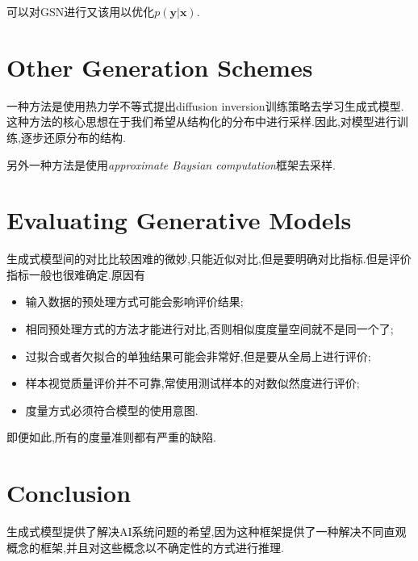 可以对GSN进行又该用以优化$p(\mathbf y|\bm x)$.

\section{Other Generation Schemes}

一种方法是使用热力学不等式提出diffusion inversion训练策略去学习生成式模型.这种方法的核心思想在于我们希望从结构化的分布中进行采样.因此,对模型进行训练,逐步还原分布的结构.

另外一种方法是使用\textit{approximate Baysian computation}框架去采样.

\section{Evaluating Generative Models}

生成式模型间的对比比较困难的微妙,只能近似对比,但是要明确对比指标.但是评价指标一般也很难确定.原因有
\begin{itemize}
    \item 输入数据的预处理方式可能会影响评价结果;
    \item 相同预处理方式的方法才能进行对比,否则相似度度量空间就不是同一个了;
    \item 过拟合或者欠拟合的单独结果可能会非常好,但是要从全局上进行评价;
    \item 样本视觉质量评价并不可靠,常使用测试样本的对数似然度进行评价;
    \item 度量方式必须符合模型的使用意图.
\end{itemize}

即便如此,所有的度量准则都有严重的缺陷.

\section{Conclusion}

生成式模型提供了解决AI系统问题的希望,因为这种框架提供了一种解决不同直观概念的框架,并且对这些概念以不确定性的方式进行推理.